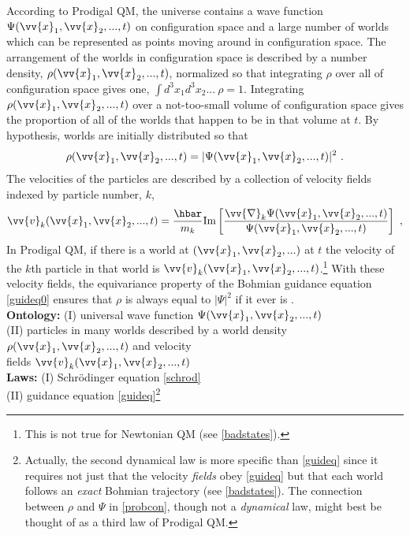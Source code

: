 \documentclass[12pt,secnumarabic,balancelastpage,amsmath,amssymb,nofootinbib]{article}
\begin{document}
According to Prodigal QM, the universe contains a wave function $\Psi(\vv{x}_1,\vv{x}_2,...,t)$ on configuration space and a large number of worlds which can be represented as points moving around in configuration space.  The arrangement of the worlds in configuration space is described by a number density, $\rho(\vv{x}_1,\vv{x}_2,...,t)$, normalized so that integrating $\rho$ over all of configuration space gives one, $\int \! d^3 x_1 d^3 x_2...\: \rho=1$.  Integrating $\rho(\vv{x}_1,\vv{x}_2,...,t)$ over a not-too-small volume of configuration space gives the proportion of all of the worlds that happen to be in that volume at $t$.  By hypothesis, worlds are initially distributed so that
\begin{equation}
\rho(\vv{x}_1,\vv{x}_2,...,t)=|\Psi(\vv{x}_1,\vv{x}_2,...,t)|^2\ .
\label{probcon}
\end{equation}
The velocities of the particles are described by a collection of velocity fields indexed by particle number, $k$,
\begin{equation}
\vv{v}_k(\vv{x}_1,\vv{x}_2,...,t)=\frac{\hbar}{m_k}\mbox{Im}\left[\frac{\vv{\nabla}_k\Psi(\vv{x}_1,\vv{x}_2,...,t)}{\Psi(\vv{x}_1,\vv{x}_2,...,t)}\right]\ ,
\label{guideq}
\end{equation}
In Prodigal QM, if there is a world at $(\vv{x}_1,\vv{x}_2,...)$ at $t$ the velocity of the $k$th particle in that world is $\vv{v}_k(\vv{x}_1,\vv{x}_2,...,t)$.\footnote{This is not true for Newtonian QM (see \textsection \ref{badstates}).}  With these velocity fields, the equivariance property of the Bohmian guidance equation \eqref{guideq0} ensures that $\rho$ is always equal to $|\Psi|^2$ if it ever is \citep[see][]{durr1992}.
\vspace*{6 pt}\\\hspace*{1.2cm}\textbf{Ontology:} (I) universal wave function $\Psi(\vv{x}_1,\vv{x}_2,...,t)$
\\\hspace*{1.2cm}(II) particles in many worlds described by a world density $\rho(\vv{x}_1,\vv{x}_2,...,t)$ and velocity
\\\hspace*{1.2cm}fields $\vv{v}_k(\vv{x}_1,\vv{x}_2,...,t)$
\\\hspace*{1.2cm}\textbf{Laws:} (I) Schr\"{o}dinger equation \eqref{schrod}
\\\hspace*{1.2cm}(II) guidance equation \eqref{guideq}\footnote{Actually, the second dynamical law is more specific than \eqref{guideq} since it requires not just that the velocity \emph{fields} obey \eqref{guideq} but that each world follows an \emph{exact} Bohmian trajectory (see \textsection \ref{badstates}).  The connection between $\rho$ and $\Psi$ in \eqref{probcon}, though not a \emph{dynamical} law, might best be thought of as a third law of Prodigal QM.}\vspace*{6 pt}
\end{document}

